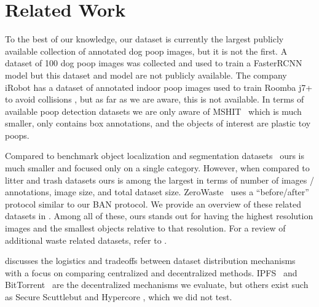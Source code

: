 
\section{Related Work}
\label{sec:relatedwork}

To the best of our knowledge, our dataset is currently the largest publicly available collection of
  annotated dog poop images, but it is not the first.
A dataset of 100 dog poop images was collected and used to train a FasterRCNN model
  \cite{neeraj_madan_dog_2019} but this dataset and model are not publicly available.
The company iRobot has a dataset of annotated indoor poop images used to train Roomba j7+ to avoid
  collisions \cite{roomba_2021}, but as far as we are aware, this is not available.
In terms of available poop detection datasets we are only aware of MSHIT~\cite{mshit_2020} which is much
  smaller, only contains box annotations, and the objects of interest are plastic toy poops.

Compared to benchmark object localization and segmentation datasets~\cite{ILSVRC15,
  lin_microsoft_2014,cordts2015cityscapes} ours is much smaller and focused only on a single category.
However, when compared to litter and trash datasets
  \cite{bashkirova_zerowaste_2022,proenca_taco_2020,hong2020trashcansemanticallysegmenteddatasetvisual,mittal2016spotgarbage,rs13050965}
  ours is among the largest in terms of number of images / annotations, image size, and total dataset size.
ZeroWaste~\cite{bashkirova_zerowaste_2022} uses a ``before/after'' protocol similar to our BAN protocol.
We provide an overview of these related datasets in .
Among all of these, ours stands out for having the highest resolution images and the smallest objects
  relative to that resolution.
For a review of additional waste related datasets, refer to \cite{agnieszka_waste}.

 discusses the logistics and tradeoffs between dataset distribution mechanisms
  with a focus on comparing centralized and decentralized methods.
IPFS~\cite{benet_ipfs_2014} and BitTorrent~\cite{cohen_incentives_2003} are the decentralized 
  mechanisms we evaluate, but others exist such as Secure Scuttlebut \cite{tarr_secure_2019} and Hypercore
  \cite{frazee_dep-0002_nodate}, which we did not test.

